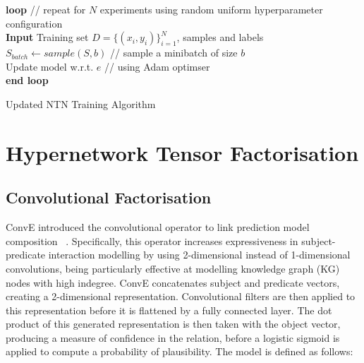 \begin{algorithm}[H]
	\textbf{loop} // repeat for $N$ experiments using random uniform hyperparameter configuration \\
		\SetAlgoLined
		\textbf{Input} 
		Training set \begin{math} D = \{(x_i, y_i)\}_{i=1}^N \end{math}, samples and labels\;
  		\begin{math} S_{batch} \gets sample(S, b) \end{math} // sample a minibatch of size \begin{math} b \end{math} \\
		Update model w.r.t. \begin{math}  e \end{math} // using Adam optimser \\
	\textbf{end loop}
	\caption{Updated NTN Training Algorithm}
\end{algorithm} \newpage



\section{Hypernetwork Tensor Factorisation}

\subsection{Convolutional Factorisation}
ConvE introduced the convolutional operator to link prediction model composition ~\citep{dettmers2018convolutional}. Specifically, this operator increases expressiveness in subject-predicate interaction modelling by using 2-dimensional instead of 1-dimensional convolutions, being particularly effective at modelling knowledge graph (KG) nodes with high indegree. ConvE concatenates subject and predicate vectors, creating a 2-dimensional representation. Convolutional filters are then applied to this representation before it is flattened by a fully connected layer. The dot product of this generated representation is then taken with the object vector, producing a measure of confidence in the relation, before a logistic sigmoid is applied to compute a probability of plausibility. The model is defined as follows:

